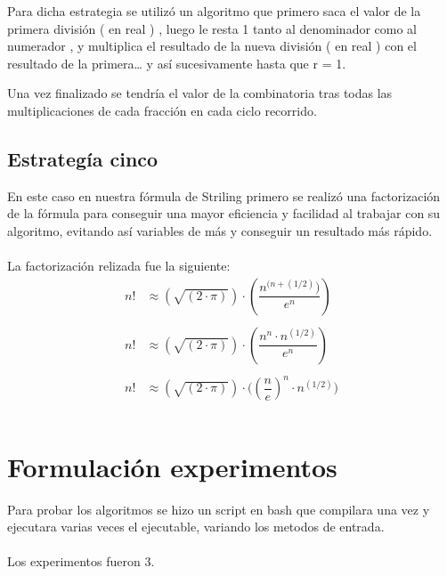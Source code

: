 \documentclass[12pt,letterpaper]{scrartcl}
\begin{document}
Para dicha estrategia se utilizó un algoritmo que primero saca el valor de la primera división ( en real ) , luego le resta 1 tanto al denominador como al numerador , y multiplica el resultado de la nueva división ( en real ) con el resultado de la primera… y así sucesivamente hasta que r = 1.

Una vez finalizado se tendría el valor de la combinatoria tras todas las multiplicaciones de cada fracción en cada ciclo recorrido.

\subsection{Estrategía cinco}

En este caso en nuestra fórmula de Striling primero se realizó una factorización de la fórmula para conseguir una mayor eficiencia y facilidad al trabajar con su algoritmo, evitando así
variables de más y conseguir un resultado más rápido.\\\\
La factorización relizada fue la siguiente:
\\
\[\begin{matrix}

{n!} &\approx {( \sqrt{(2 \cdot \pi)} )}\cdot{(\dfrac{n^{(n+(1/2)})}{e^n})}\\

&\\

{n!} &\approx {( \sqrt{(2 \cdot \pi)} )}\cdot{( \dfrac{ n^n \cdot n^{(1/2)} }{ e^n })}\\

&\\

{n!} &\approx {( \sqrt{(2 \cdot \pi)} )}\cdot{( ( \dfrac{ n }{ e } )^n }\cdot{ n^{(1/2)} )}\\

&\\

\end{matrix}
\]
\section{Formulación experimentos}

Para probar los algoritmos se hizo un script en bash que compilara una vez y ejecutara varias veces el ejecutable, variando los metodos de entrada. 
\\\\

Los experimentos fueron 3.
\end{document}
